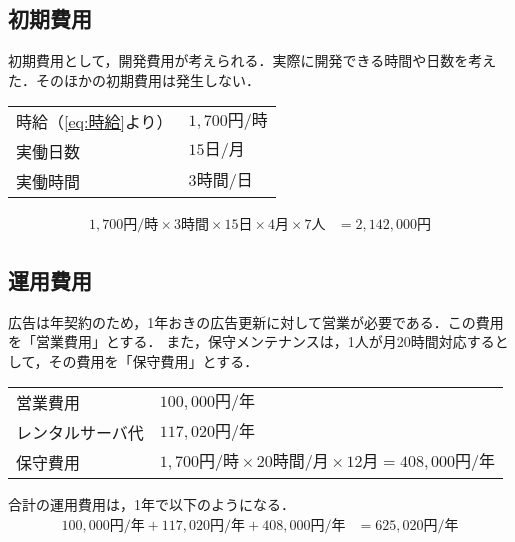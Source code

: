 \subsection{初期費用}
初期費用として，開発費用が考えられる．実際に開発できる時間や日数を考えた．そのほかの初期費用は発生しない．
\begin{framed}
	\begin{tabular}{ll}
		時給（\eqref{eq:時給}より） & \(1,700\text{円/時}\) \\
		実働日数                & \(15\text{日/月}\)    \\
		実働時間                & \(3\text{時間/日}\)
	\end{tabular}
\end{framed}
\begin{equation}
	\begin{aligned}
		1,700{円/時}\times 3\text{時間}\times 15\text{日}\times 4\text{月}\times 7\text{人} & = 2,142,000\text{円}\label{eq:開発費用}
	\end{aligned}
\end{equation}
\subsection{運用費用}
広告は年契約のため，1年おきの広告更新に対して営業が必要である．この費用を「営業費用」とする．
また，保守メンテナンスは，1人が月20時間対応するとして，その費用を「保守費用」とする．
\begin{framed}
	\begin{tabular}{ll}
		営業費用     & \(100,000\text{円/年}\)                                                      \\
		レンタルサーバ代 & \(117,020\text{円/年}\)                                                      \\
		保守費用     & \(1,700\text{円/時}\times 20\text{時間/月}\times 12\text{月}=408,000\text{円/年}\) \\
	\end{tabular}
\end{framed}
合計の運用費用は，1年で以下のようになる．
\begin{equation}
	\begin{aligned}
		100,000\text{円/年}+117,020\text{円/年}+408,000\text{円/年} & =625,020\text{円/年}\label{eq:運用費用}
	\end{aligned}
\end{equation}
